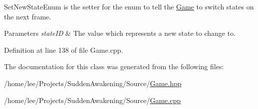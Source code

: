 Set\-New\-State\-Enum is the setter for the enum to tell the \hyperlink{class_game}{Game} to switch states on the next frame. 


\begin{DoxyParams}{Parameters}
{\em state\-I\-D} & The value which represents a new state to change to. \\
\hline
\end{DoxyParams}


Definition at line 138 of file Game.\-cpp.



The documentation for this class was generated from the following files\-:\begin{DoxyCompactItemize}
\item 
/home/lee/\-Projects/\-Sudden\-Awakening/\-Source/\hyperlink{_game_8hpp}{Game.\-hpp}\item 
/home/lee/\-Projects/\-Sudden\-Awakening/\-Source/\hyperlink{_game_8cpp}{Game.\-cpp}\end{DoxyCompactItemize}
